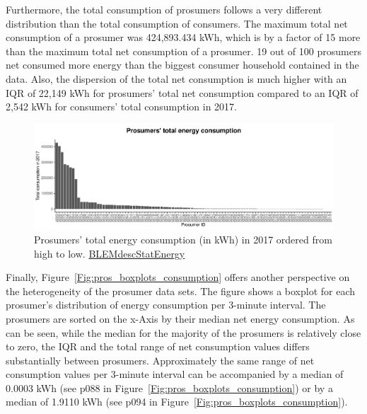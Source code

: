 Furthermore, the total consumption of prosumers follows a very different distribution than the total consumption of consumers. The maximum total net consumption of a prosumer was 424,893.434 kWh, which is by a factor of 15 more than the maximum total net consumption of a prosumer. 19 out of 100 prosumers net consumed more energy than the biggest consumer household contained in the data. Also, the dispersion of the total net consumption is much higher with an IQR of 22,149 kWh for prosumers' total net consumption compared to an IQR of 2,542 kWh for consumers' total consumption in 2017.

\begin{figure}[htbp]
 \centering
\includegraphics[width=\textwidth]{thesis/graphs/prosumer_totalconsumption2.pdf}
\caption[Prosumers’ total energy consumption (in kWh) in 2017]{Prosumers’ total energy consumption (in kWh) in 2017 ordered from high to low. \quantnet\href{ }{BLEMdescStatEnergy}}
\label{Fig:pros_total_consumption}
\end{figure}

Finally, Figure~\ref{Fig:pros_boxplots_consumption} offers another perspective on the heterogeneity of the prosumer data sets. The figure shows a boxplot for each prosumer's distribution of energy consumption per 3-minute interval. The prosumers are sorted on the x-Axis by their median net energy consumption. As can be seen, while the median for the majority of the prosumers is relatively close to zero, the IQR and the total range of net consumption values differs substantially between prosumers. Approximately the same range of net consumption values per 3-minute interval can be accompanied by a median of 0.0003 kWh (see p088 in Figure~\ref{Fig:pros_boxplots_consumption}) or by a median of 1.9110 kWh (see p094 in Figure~\ref{Fig:pros_boxplots_consumption}).

